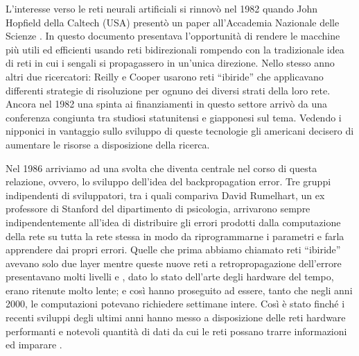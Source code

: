 L'interesse verso le reti neurali artificiali si rinnovò nel 1982 quando  John Hopfield della Caltech (USA) presentò un paper all'Accademia Nazionale delle Scienze \cite{hopfield1982neural}. In questo documento presentava l'opportunità di rendere le macchine più utili ed efficienti usando reti bidirezionali rompendo con la tradizionale idea di reti in cui i sengali si propagassero in un'unica direzione. Nello stesso anno altri due ricercatori: Reilly e Cooper usarono reti ``ibiride'' che applicavano differenti strategie di risoluzione per ognuno dei diversi strati della loro rete. Ancora nel 1982 una spinta ai finanziamenti in questo settore arrivò da una conferenza congiunta tra studiosi statunitensi e giapponesi sul tema. Vedendo i nipponici in vantaggio sullo sviluppo di queste tecnologie gli americani decisero di aumentare le risorse a disposizione della ricerca.

Nel 1986 arriviamo ad una svolta che diventa centrale nel corso di questa relazione, ovvero, lo sviluppo dell'idea del backpropagation error. Tre gruppi indipendenti di sviluppatori, tra i quali compariva David Rumelhart, un ex professore di Stanford del dipartimento di psicologia, arrivarono sempre indipendentemente all'idea  di distribuire gli errori prodotti dalla computazione della rete su tutta la rete stessa in modo da riprogrammarne i parametri e farla apprendere dai propri errori.
Quelle che prima abbiamo chiamato reti ``ibiride'' avevano solo due layer mentre queste nuove reti a retropropagazione dell'errore presentavano molti livelli e , dato lo stato dell'arte degli hardware del tempo, erano ritenute molto lente; e così hanno proseguito ad essere, tanto che negli anni 2000, le computazioni potevano richiedere settimane intere. Così è stato finché i recenti sviluppi degli ultimi anni hanno messo a disposizione delle reti hardware performanti e notevoli quantità di dati da cui le reti possano trarre informazioni ed imparare \cite{stanford_history}.


